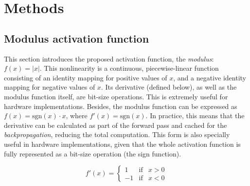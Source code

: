 



\section{Methods} \label{sec:modulus_methods}
\subsection{Modulus activation function}
This section introduces the proposed activation function, the \textit{modulus}: $f(x)=|x|$. This nonlinearity is a continuous, piecewise-linear function consisting of an identity mapping for positive values of $x$, and a negative identity mapping for negative values of $x$. Its derivative (defined below), as well as the modulus function itself, are bit-size operations. This is extremely useful for hardware implementations. Besides, the modulus function can be expressed as $f(x) = \text{sgn}(x)\cdot x$, where $f'(x) = \text{sgn}(x)$. In practice, this means that the derivative can be calculated as part of the forward pass and cached for the \textit{backpropagation}, reducing the total computation. This form is also specially useful in hardware implementations, given that the whole activation function is fully represented as a bit-size operation (the sign function).

$$
f'(x)= \left\{ \begin{array}{lcc}
1 &   \text{if}  & x > 0 \\
-1 &  \text{if} & x < 0
\end{array} \right.
$$


